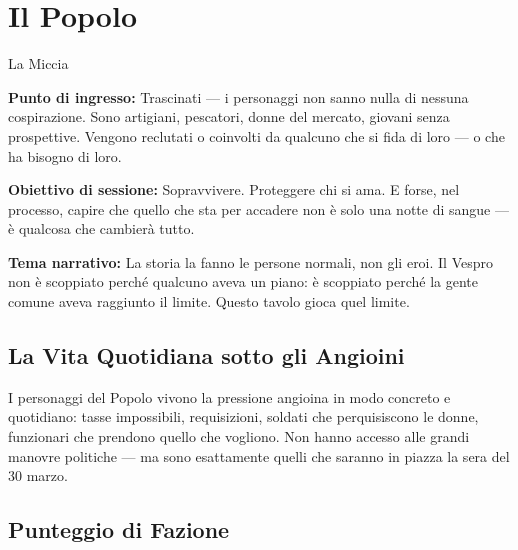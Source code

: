 
\secsep

\section{Il Popolo}
\textcolor{oro}{\cinzel\large La Miccia}

\filetto

\textbf{Punto di ingresso:} Trascinati — i personaggi non sanno nulla
di nessuna cospirazione. Sono artigiani, pescatori, donne del mercato,
giovani senza prospettive. Vengono reclutati o coinvolti da qualcuno
che si fida di loro — o che ha bisogno di loro.

\textbf{Obiettivo di sessione:} Sopravvivere. Proteggere chi si ama.
E forse, nel processo, capire che quello che sta per accadere non è
solo una notte di sangue — è qualcosa che cambierà tutto.

\textbf{Tema narrativo:} La storia la fanno le persone normali, non
gli eroi. Il Vespro non è scoppiato perché qualcuno aveva un piano:
è scoppiato perché la gente comune aveva raggiunto il limite. Questo
tavolo gioca quel limite.

\subsection{La Vita Quotidiana sotto gli Angioini}

I personaggi del Popolo vivono la pressione angioina in modo concreto
e quotidiano: tasse impossibili, requisizioni, soldati che perquisiscono
le donne, funzionari che prendono quello che vogliono. Non hanno
accesso alle grandi manovre politiche — ma sono esattamente quelli
che saranno in piazza la sera del 30 marzo.

\subsection{Punteggio di Fazione}

